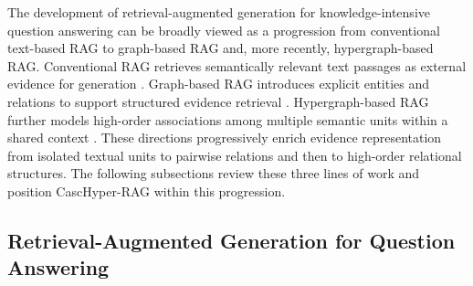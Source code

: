 \documentclass[a4paper,fleqn]{cas-dc}
\begin{document}
The development of retrieval-augmented generation for knowledge-intensive question answering can be broadly viewed as a progression from conventional text-based RAG to graph-based RAG and, more recently, hypergraph-based RAG. Conventional RAG retrieves semantically relevant text passages as external evidence for generation \citep{Lewis2020RAG}. Graph-based RAG introduces explicit entities and relations to support structured evidence retrieval \citep{Peng2025GraphRAGSurvey}. Hypergraph-based RAG further models high-order associations among multiple semantic units within a shared context \citep{Feng2026HyperRAG}. These directions progressively enrich evidence representation from isolated textual units to pairwise relations and then to high-order relational structures. The following subsections review these three lines of work and position CascHyper-RAG within this progression.

\subsection{Retrieval-Augmented Generation for Question Answering}
\end{document}
